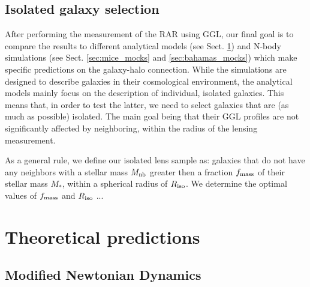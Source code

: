 \documentclass[usenatbib]{mnras}
\newcommand{\un}[1]{_{\rm #1}}
\begin{document}
\subsection{Isolated galaxy selection}
\label{sec:isolation}

After performing the measurement of the RAR using GGL, our final goal is to compare the results to different analytical models (see Sect. \ref{sec:predictions}) and N-body simulations (see Sect. \ref{sec:mice_mocks} and \ref{sec:bahamas_mocks}) which make specific predictions on the galaxy-halo connection. While the simulations are designed to describe galaxies in their cosmological environment, the analytical models mainly focus on the description of individual, isolated galaxies. This means that, in order to test the latter, we need to select galaxies that are (as much as possible) isolated. The main goal being that their GGL profiles are not significantly affected by neighboring, within the radius of the lensing measurement.

As a general rule, we define our isolated lens sample as: galaxies that do not have any neighbors with a stellar mass $M\un{nb}$ greater then a fraction $f\un{mass}$ of their stellar mass $M_*$, within a spherical radius of $R\un{iso}$. We determine the optimal values of $f\un{mass}$ and $R\un{iso}$ ...


\section{Theoretical predictions}
\label{sec:predictions}

\subsection{Modified Newtonian Dynamics}
\label{sec:MOND}
\end{document}

